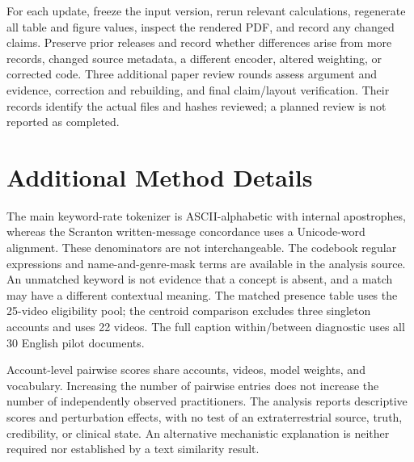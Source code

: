 For each update, freeze the input version, rerun relevant calculations, regenerate all table and figure values, inspect the rendered PDF, and record any changed claims. Preserve prior releases and record whether differences arise from more records, changed source metadata, a different encoder, altered weighting, or corrected code. Three additional paper review rounds assess argument and evidence, correction and rebuilding, and final claim/layout verification. Their records identify the actual files and hashes reviewed; a planned review is not reported as completed.

\section{Additional Method Details}
The main keyword-rate tokenizer is ASCII-alphabetic with internal apostrophes, whereas the Scranton written-message concordance uses a Unicode-word alignment. These denominators are not interchangeable. The codebook regular expressions and name-and-genre-mask terms are available in the analysis source. An unmatched keyword is not evidence that a concept is absent, and a match may have a different contextual meaning. The matched presence table uses the 25-video eligibility pool; the centroid comparison excludes three singleton accounts and uses 22 videos. The full caption within/between diagnostic uses all 30 English pilot documents.

Account-level pairwise scores share accounts, videos, model weights, and vocabulary. Increasing the number of pairwise entries does not increase the number of independently observed practitioners. The analysis reports descriptive scores and perturbation effects, with no test of an extraterrestrial source, truth, credibility, or clinical state. An alternative mechanistic explanation is neither required nor established by a text similarity result.
